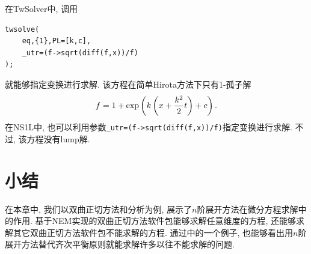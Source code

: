 在TwSolver中, 调用
\begin{verbatim}
twsolve(
    eq,{1},PL=[k,c],
    _utr=(f->sqrt(diff(f,x))/f)
);
\end{verbatim}
就能够指定变换进行求解. 该方程在简单Hirota方法下只有1-孤子解
\begin{equation}
    f=1+\exp\left(k\left(x+\frac{k^2}{2}t\right)+c\right).
\end{equation}
在NS1L中, 也可以利用参数\verb|_utr=(f->sqrt(diff(f,x))/f)|指定变换进行求解. 不过, 该方程没有lump解. 

\section{小结}
在本章中, 我们以双曲正切方法和\Painleve{}分析为例, 展示了$n$阶展开方法在微分方程求解中的作用. 基于NEM实现的双曲正切方法软件包能够求解任意维度的方程, 还能够求解其它双曲正切方法软件包不能求解的方程. 通过\Painleve{}中的一个例子, 也能够看出用$n$阶展开方法替代齐次平衡原则就能求解许多以往不能求解的问题. 

